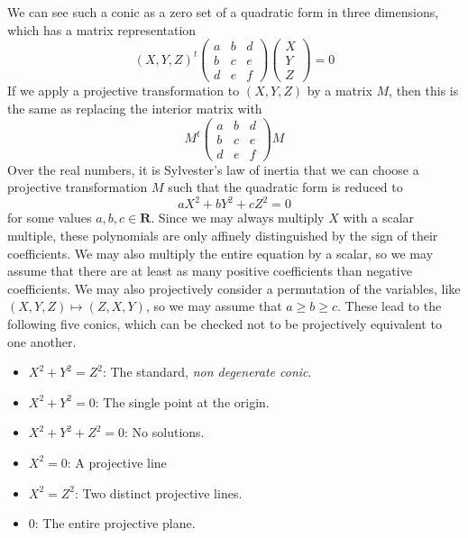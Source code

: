 We can see such a conic as a zero set of a quadratic form in three dimensions, which has a matrix representation
%
\[ (X,Y,Z)^t \begin{pmatrix} a & b & d \\ b & c & e \\ d & e & f \end{pmatrix} \begin{pmatrix} X \\ Y \\ Z \end{pmatrix} = 0 \]
%
If we apply a projective transformation to $(X,Y,Z)$ by a matrix $M$, then this is the same as replacing the interior matrix with
%
\[ M^t \begin{pmatrix} a & b & d \\ b & c & e \\ d & e & f \end{pmatrix} M \]
%
Over the real numbers, it is Sylvester's law of inertia that we can choose a projective transformation $M$ such that the quadratic form is reduced to
%
\[ aX^2 + bY^2 + cZ^2 = 0 \]
%
for some values $a,b,c \in \mathbf{R}$. Since we may always multiply $X$ with a scalar multiple, these polynomials are only affinely distinguished by the sign of their coefficients. We may also multiply the entire equation by a scalar, so we may assume that there are at least as many positive coefficients than negative coefficients. We may also projectively consider a permutation of the variables, like $(X,Y,Z) \mapsto (Z,X,Y)$, so we may assume that $a \geq b \geq c$. These lead to the following five conics, which can be checked not to be projectively equivalent to one another.
%
\begin{itemize}
    \item $X^2 + Y^2 = Z^2$: The standard, {\it non degenerate conic}.
    \item $X^2 + Y^2 = 0$: The single point at the origin.
    \item $X^2 + Y^2 + Z^2 = 0$: No solutions.
    \item $X^2 = 0$: A projective line 
    \item $X^2 = Z^2$: Two distinct projective lines.
    \item $0$: The entire projective plane.
\end{itemize}
%
